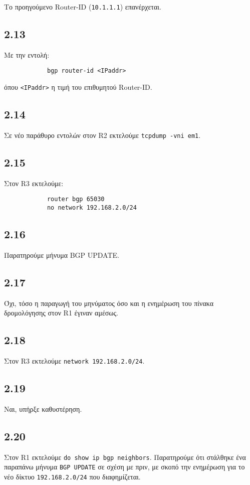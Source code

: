 \documentclass[a4paper, 12pt]{article}
\begin{document}
		Το προηγούμενο Router-ID (\verb|10.1.1.1|) επανέρχεται.

	\subsection*{2.13}
		Με την εντολή:
		
		\begin{verbatim}
			bgp router-id <IPaddr>
		\end{verbatim}
		
		όπου \verb|<IPaddr>| η τιμή του επιθυμητού Router-ID. 

	\subsection*{2.14}
		Σε νέο παράθυρο εντολών στον R2 εκτελούμε \verb|tcpdump -vni em1|.

	\subsection*{2.15}
		Στον R3 εκτελούμε:
		
		\begin{verbatim}
			router bgp 65030 
			no network 192.168.2.0/24
		\end{verbatim}

	\subsection*{2.16}
		Παρατηρούμε μήνυμα BGP UPDATE.

	\subsection*{2.17}
		Όχι, τόσο η παραγωγή του μηνύματος όσο και η ενημέρωση του πίνακα δρομολόγησης στον R1 έγιναν αμέσως.

	\subsection*{2.18}
		Στον R3 εκτελούμε \verb|network 192.168.2.0/24|.

	\subsection*{2.19}
		Ναι, υπήρξε καθυστέρηση.

	\subsection*{2.20}
		Στον R1 εκτελούμε \verb|do show ip bgp neighbors|. Παρατηρούμε ότι στάλθηκε ένα παραπάνω μήνυμα \verb|BGP UPDATE| σε σχέση με πριν, με σκοπό την ενημέρωση για το νέο δίκτυο \verb|192.168.2.0/24| που διαφημίζεται.
		
\end{document}
